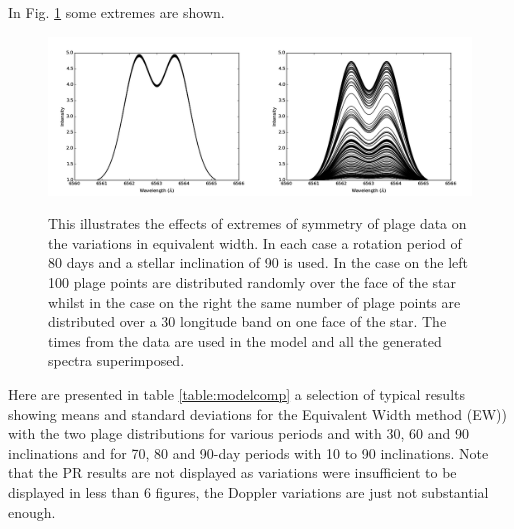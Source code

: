 In Fig. \ref{fig:extremew} some extremes are shown.

\begin{figure}[!htbp]
\begin{center}
\includegraphics[scale=0.25]{Figures/extremes.png} \\
\end{center}
\caption{This illustrates the effects of extremes of symmetry of plage data on the variations in equivalent width. In
  each case a rotation period of 80 days and a stellar inclination of 90{\degree} is used. In the case on the left 100 plage
  points are distributed randomly over the face of the star whilst in the case on the right the same number of plage
  points are distributed over a 30{\degree} longitude band on one face of the star. The times from the {\harps} data are
  used in the model and all the generated spectra superimposed.} 
\protect\label{fig:extremew}
\end{figure}

Here are presented in table \ref{table:modelcomp} a selection of typical results showing means and standard deviations
for the Equivalent Width method (EW)) with the two plage distributions for various periods and with 30{\degree},
60{\degree} and 90{\degree} inclinations and for 70, 80 and 90-day periods with 10{\degree} to 90{\degree} inclinations.
Note that the PR results are not displayed as variations were insufficient to be displayed in less than 6 figures, the
Doppler variations are just not substantial enough.

